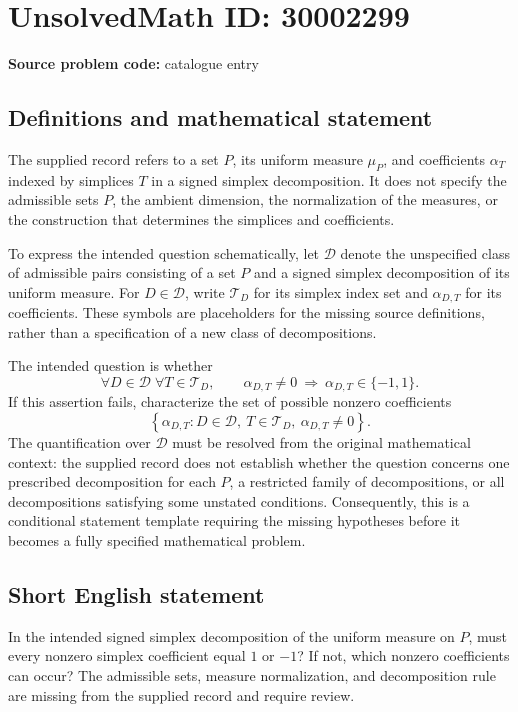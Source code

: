 \documentclass[11pt]{article}
\begin{document}
\section*{UnsolvedMath ID: 30002299}
\textbf{Source problem code:} catalogue entry
\subsection{Definitions and mathematical statement}
The supplied record refers to a set \(P\), its uniform measure \(\mu_P\), and coefficients \(\alpha_T\) indexed by simplices \(T\) in a signed simplex decomposition. It does not specify the admissible sets \(P\), the ambient dimension, the normalization of the measures, or the construction that determines the simplices and coefficients.

To express the intended question schematically, let \(\mathcal D\) denote the unspecified class of admissible pairs consisting of a set \(P\) and a signed simplex decomposition of its uniform measure. For \(D\in\mathcal D\), write \(\mathcal T_D\) for its simplex index set and \(\alpha_{D,T}\) for its coefficients. These symbols are placeholders for the missing source definitions, rather than a specification of a new class of decompositions.

The intended question is whether
\[
\forall D\in\mathcal D\;\forall T\in\mathcal T_D,
\qquad
\alpha_{D,T}\ne 0
\ \Longrightarrow\ 
\alpha_{D,T}\in\{-1,1\}.
\]
If this assertion fails, characterize the set of possible nonzero coefficients
\[
\left\{\alpha_{D,T}:D\in\mathcal D,\ T\in\mathcal T_D,\ \alpha_{D,T}\ne0\right\}.
\]
The quantification over \(\mathcal D\) must be resolved from the original mathematical context: the supplied record does not establish whether the question concerns one prescribed decomposition for each \(P\), a restricted family of decompositions, or all decompositions satisfying some unstated conditions. Consequently, this is a conditional statement template requiring the missing hypotheses before it becomes a fully specified mathematical problem.
\subsection{Short English statement}
In the intended signed simplex decomposition of the uniform measure on \(P\), must every nonzero simplex coefficient equal \(1\) or \(-1\)? If not, which nonzero coefficients can occur? The admissible sets, measure normalization, and decomposition rule are missing from the supplied record and require review.
\end{document}
